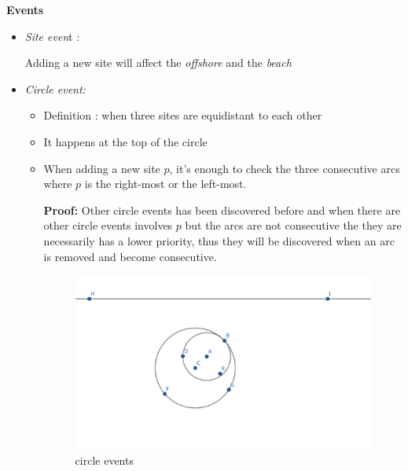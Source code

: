 \documentclass{article}
\begin{document}
 \textbf{Events}
    \begin{itemize}
        \item \textit{Site even}t :
            \begin{displayquote}
            Adding a new site will affect the {\it{offshore}} and the \it{beach} 
            \end{displayquote}
            
        \item \textit{Circle event:}
            \begin{displayquote}
            \begin{itemize}
                \item Definition : when three sites are equidistant to each other
                \item It happens at the top of the circle 
                \item When adding a new site $p$, it's enough to check the three consecutive arcs  where $p$ is the right-most or the left-most.
                \begin{displayquote}
                {\textbf{Proof:}} Other circle events has been discovered before and when there are other circle events involves $p$ but the arcs are not consecutive the they are necessarily has a lower priority, thus they will be discovered when an arc is removed and become consecutive.
                \begin{figure}[h]
                \centering
                 \includegraphics{circle-event.png}
                    \caption{circle events}
                    \label{fig:my_label}
                \end{figure}
                \end{displayquote}
                

\end{itemize}
\end{displayquote}
\end{itemize}
\end{document}
